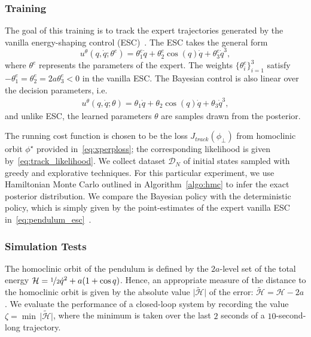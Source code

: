 \subsubsection{Training} 
The goal of this training is to track the expert trajectories generated by the
vanilla energy-shaping control (ESC)~\cite{underactuated}. The ESC takes the
general form
%
\begin{equation}
    u^\theta(q, \dot{q}; \theta^e) = \theta^e_1 \dot{q} + \theta^e_2 \cos{(q)} \dot{q} + \theta^e_3 \dot{q}^3,
    \label{eq:pendulum_esc}
\end{equation}
%
where $\theta^e$ represents the parameters of the expert. The weights
$\{\theta^e_i\}_{i=1}^3$ satisfy $-\theta^e_1 = \theta^e_2 = 2a \theta^e_3 < 0$
in the vanilla ESC. 
%
The Bayesian control is also linear over the decision parameters, i.e.
\begin{align*}
    u^\theta(q, \dot{q}; \theta) = \theta_1 \dot{q} + \theta_2 \cos{(q)} \dot{q} + \theta_3 \dot{q}^3,
\end{align*}
and unlike ESC, the learned parameters $\theta$ are samples drawn from the posterior.


The running cost function is chosen to be the loss $J_{track}(\phi_\bot)$ from
homoclinic orbit $\phi^\star$ provided in~\eqref{eq:xperploss}; the
corresponding likelihood is given by~\eqref{eq:track_likelihood}. We collect
dataset $\mathcal{D}_N$ of initial states sampled with greedy and explorative
techniques. For this particular experiment, we use Hamiltonian Monte Carlo
outlined in Algorithm~\ref{algo:hmc} to infer the exact posterior distribution.
We compare the Bayesian policy with the deterministic policy, which is simply
given by the point-estimates of the expert vanilla ESC
in~\eqref{eq:pendulum_esc}~\cite{acc}.

\subsubsection{Simulation Tests} 
The homoclinic orbit of the pendulum is defined by the $2a$-level set of the
total energy $\mathcal{H} = \nicefrac{1}{2}\dot{q}^2 + a(1 +
\cos{q})$. Hence, an appropriate measure of the distance to the
homoclinic orbit is given by the absolute value $\bigl| \mathcal{\tilde{H}}
\bigr|$ of the error: $\mathcal{\tilde{H}} = \mathcal{H} - 2a$. We evaluate the
performance of a closed-loop system by recording the value $\zeta = \min \,
\bigl| \mathcal{\tilde{H}} \bigr|$, where the minimum is taken over the last $2$
seconds of a $10$-second-long trajectory.


